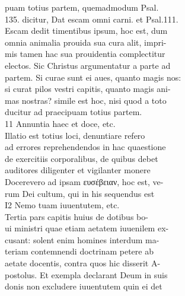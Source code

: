 \documentclass{article}
\begin{document}
\begin{pages}
                puam totius partem, quemadmodum Psal. \\
                135. dicitur, Dat escam omni carni. et Psal.111. \\
                Escam dedit timentibus ipsum, hoc est, dum \\
                omnia animalia prouida sua cura alit, impri- \\
                mis tamen hac sua prouidentia complectitur \\
                electos. Sic Christus argumentatur a parte ad \\
                partem. Si curae sunt ei aues, quanto magis nos: \\
                si curat pilos vestri capitis, quanto magis ani- \\
                mas nostras? simile est hoc, nisi quod a toto \\
                ducitur ad praecipuam totius partem. \\
                11 Annuntia haec et doce, etc. \\
                Illatio est totius loci, denuntiare refero \\
                ad errores reprehendendos in hac quaestione \\
                de exercitiis corporalibus, de quibus debet \\
                auditores diligenter et vigilanter monere \\
                Docerevero ad ipsam ευσέβειαν, hoc est, ve- \\
                rum Dei cultum, qui in his sequendus est \\
                I2 Nemo tuam iuuentutem, etc. \\
                Tertia pars capitis huius de dotibus bo- \\
                ui ministri quae etiam aetatem iuuenilem ex- \\
                cusant: solent enim homines interdum ma- \\
                teriam contemnendi doctrinam petere ab \\
                aetate docentis, contra quos hic disserit A- \\
                postolus. Et exempla declarant Deum in suis \\
                donis non excludere iuuentutem quin ei det \\
\end{pages}
\end{document}
